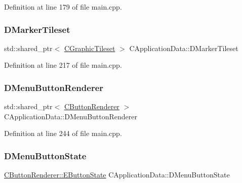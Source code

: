 Definition at line 179 of file main.\+cpp.

\hypertarget{classCApplicationData_ae9f336696b810bff2353d731300ec9d7}{}\label{classCApplicationData_ae9f336696b810bff2353d731300ec9d7} 
\subsubsection{\texorpdfstring{D\+Marker\+Tileset}{DMarkerTileset}}
{\footnotesize\ttfamily std\+::shared\+\_\+ptr$<$ \hyperlink{classCGraphicTileset}{C\+Graphic\+Tileset} $>$ C\+Application\+Data\+::\+D\+Marker\+Tileset\hspace{0.3cm}{\ttfamily [protected]}}



Definition at line 217 of file main.\+cpp.

\hypertarget{classCApplicationData_a2c9f10aa452454a016e0164f6ce777a6}{}\label{classCApplicationData_a2c9f10aa452454a016e0164f6ce777a6} 
\subsubsection{\texorpdfstring{D\+Menu\+Button\+Renderer}{DMenuButtonRenderer}}
{\footnotesize\ttfamily std\+::shared\+\_\+ptr$<$ \hyperlink{classCButtonRenderer}{C\+Button\+Renderer} $>$ C\+Application\+Data\+::\+D\+Menu\+Button\+Renderer\hspace{0.3cm}{\ttfamily [protected]}}



Definition at line 244 of file main.\+cpp.

\hypertarget{classCApplicationData_a92e86e12efc0c3246550b3043b892bea}{}\label{classCApplicationData_a92e86e12efc0c3246550b3043b892bea} 
\subsubsection{\texorpdfstring{D\+Menu\+Button\+State}{DMenuButtonState}}
{\footnotesize\ttfamily \hyperlink{classCButtonRenderer_ae0eccda184600f6e14bfd59033e5e9a1}{C\+Button\+Renderer\+::\+E\+Button\+State} C\+Application\+Data\+::\+D\+Menu\+Button\+State\hspace{0.3cm}{\ttfamily [protected]}}



